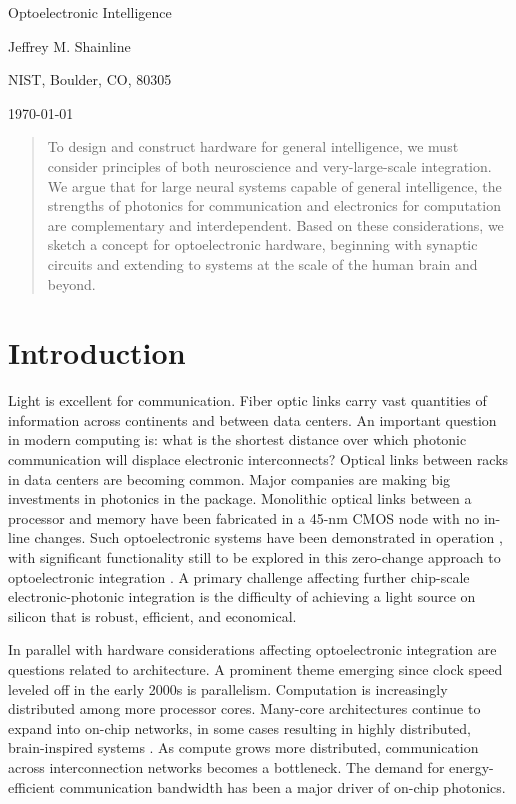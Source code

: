 \documentclass[twocolumn]{article}
\begin{document}
	
	\centerline{\LARGE Optoelectronic Intelligence}%
	\vspace{0.75em}
	\centerline{\Large Jeffrey M. Shainline}
	\vspace{0.5em}
	\centerline{\large NIST, Boulder, CO, 80305}
	\vspace{0.5em}
	\centerline{\large \today}
	
\begin{abstract}
To design and construct hardware for general intelligence, we must consider principles of both neuroscience and very-large-scale integration. We argue that for large neural systems capable of general intelligence, the strengths of photonics for communication and electronics for computation are complementary and interdependent. Based on these considerations, we sketch a concept for optoelectronic hardware, beginning with synaptic circuits and extending to systems at the scale of the human brain and beyond.
\end{abstract}

\section{\label{sec:introduction}Introduction}
Light is excellent for communication. Fiber optic links carry vast quantities of information across continents and between data centers. An important question in modern computing is: what is the shortest distance over which photonic communication will displace electronic interconnects? Optical links between racks in data centers are becoming common. Major companies are making big investments in photonics in the package. Monolithic optical links between a processor and memory have been fabricated in a 45-nm CMOS node with no in-line changes. Such optoelectronic systems have been demonstrated in operation \cite{suwa2015}, with significant functionality still to be explored in this zero-change approach to optoelectronic integration \cite{stra2018}. A primary challenge affecting further chip-scale electronic-photonic integration is the difficulty of achieving a light source on silicon that is robust, efficient, and economical.

In parallel with hardware considerations affecting optoelectronic integration are questions related to architecture. A prominent theme emerging since clock speed leveled off in the early 2000s is parallelism. Computation is increasingly distributed among more processor cores. Many-core architectures continue to expand into on-chip networks, in some cases resulting in highly distributed, brain-inspired systems \cite{bo2000,pfgr2013,mear2014,fuga2014,payu2017,dasr2018}. As compute grows more distributed, communication across interconnection networks becomes a bottleneck. The demand for energy-efficient communication bandwidth has been a major driver of on-chip photonics.
\end{document}
